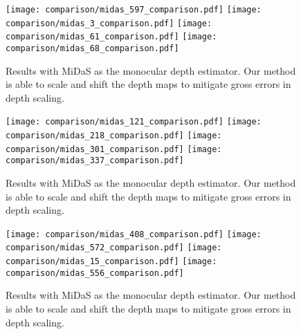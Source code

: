 % 
% 
\begin{figure}[H]
  \texttt{[image: comparison/midas\_597\_comparison.pdf]}
  \texttt{[image: comparison/midas\_3\_comparison.pdf]}
  \texttt{[image: comparison/midas\_61\_comparison.pdf]}
  \texttt{[image: comparison/midas\_68\_comparison.pdf]}
  \caption{Results with MiDaS as the monocular depth estimator. Our method is able to scale and shift
    the depth maps to mitigate gross errors in depth scaling.}
  \label{fig:midas_1}
\end{figure}
\begin{figure}[H]
  \texttt{[image: comparison/midas\_121\_comparison.pdf]}
  \texttt{[image: comparison/midas\_218\_comparison.pdf]}
  \texttt{[image: comparison/midas\_301\_comparison.pdf]}
  \texttt{[image: comparison/midas\_337\_comparison.pdf]}
  \caption{Results with MiDaS as the monocular depth estimator. Our method is able to scale and shift
    the depth maps to mitigate gross errors in depth scaling.}
  \label{fig:midas_2}
\end{figure}
\begin{figure}[H]
  \texttt{[image: comparison/midas\_408\_comparison.pdf]}
  \texttt{[image: comparison/midas\_572\_comparison.pdf]}
  \texttt{[image: comparison/midas\_15\_comparison.pdf]}
  \texttt{[image: comparison/midas\_556\_comparison.pdf]}
  \caption{Results with MiDaS as the monocular depth estimator. Our method is able to scale and shift
    the depth maps to mitigate gross errors in depth scaling.}
  \label{fig:midas_3}
\end{figure}
